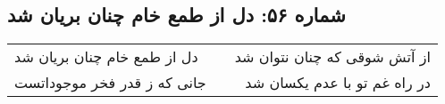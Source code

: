 \begin{center}
\section*{شماره ۵۶: دل از طمع خام چنان بریان شد}
\label{sec:056}
\begin{longtable}{l p{0.5cm} r}
دل از طمع خام چنان بریان شد
&&
از آتش شوقی که چنان نتوان شد
\\
جانی که ز قدر فخر موجوداتست
&&
در راه غم تو با عدم یکسان شد
\\
\end{longtable}
\end{center}
